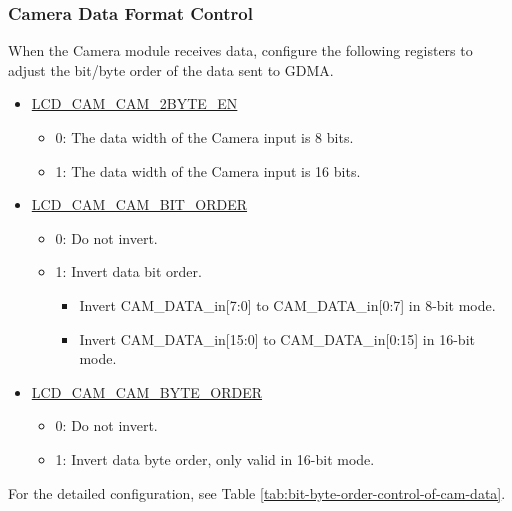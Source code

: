 \documentclass[main\_\_EN.tex]{subfiles}
\begin{document}
\subsubsection{Camera Data Format Control} \label{sec:cam_data_control}
When the Camera module receives data, configure the following registers to adjust the bit/byte order of the data sent to GDMA.
\begin{itemize}
    \item \hyperref[fielddesc:LCDCAMCAM2BYTEEN]{LCD\_CAM\_CAM\_2BYTE\_EN}
    \begin{itemize}
        \item 0: The data width of the Camera input is 8 bits.
        \item 1: The data width of the Camera input is 16 bits.
    \end{itemize}
    \item \hyperref[fielddesc:LCDCAMCAMBITORDER]{LCD\_CAM\_CAM\_BIT\_ORDER}
        \begin{itemize}
        \item 0: Do not invert.
        \item 1: Invert data bit order.
        \begin{itemize}
            \item Invert CAM\_DATA\_in[7:0] to CAM\_DATA\_in[0:7] in 8-bit mode.
            \item Invert CAM\_DATA\_in[15:0] to CAM\_DATA\_in[0:15] in 16-bit mode.
        \end{itemize}
    \end{itemize}
    \item \hyperref[fielddesc:LCDCAMCAMBYTEORDER]{LCD\_CAM\_CAM\_BYTE\_ORDER}
    \begin{itemize}
        \item 0: Do not invert.
        \item 1: Invert data byte order, only valid in 16-bit mode.
    \end{itemize}
\end{itemize}

For the detailed configuration, see Table \ref{tab:bit-byte-order-control-of-cam-data}.
\end{document}
